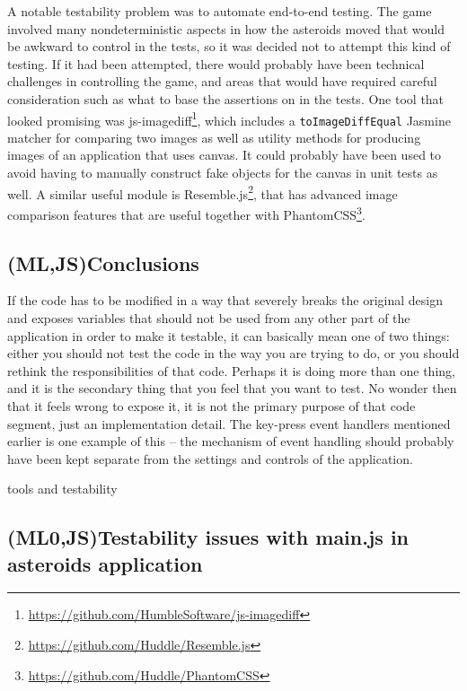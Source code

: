 \documentclass[11pt]{article}
\begin{document}
A notable testability problem was to automate end-to-end testing. The game involved many nondeterministic aspects in how the asteroids moved that would be awkward to control in the tests, so it was decided not to attempt this kind of testing. If it had been attempted, there would probably have been technical challenges in controlling the game, and areas that would have required careful consideration such as what to base the assertions on in the tests. One tool that looked promising was js-imagediff\footnote{\url{https://github.com/HumbleSoftware/js-imagediff}}, which includes a \texttt{toImageDiffEqual} Jasmine matcher for comparing two images as well as utility methods for producing images of an application that uses canvas. It could probably have been used to avoid having to manually construct fake objects for the canvas in unit tests as well. A similar useful module is Resemble.js\footnote{\url{https://github.com/Huddle/Resemble.js}}, that has advanced image comparison features that are useful together with PhantomCSS\footnote{\url{https://github.com/Huddle/PhantomCSS}}.

\subsection{(ML,JS)Conclusions}

If the code has to be modified in a way that severely breaks the original design and exposes variables that should not be used from any other part of the application in order to make it testable, it can basically mean one of two things: either you should not test the code in the way you are trying to do, or you should rethink the responsibilities of that code. Perhaps it is doing more than one thing, and it is the secondary thing that you feel that you want to test. No wonder then that it feels wrong to expose it, it is not the primary purpose of that code segment, just an implementation detail. The key-press event handlers mentioned earlier is one example of this -- the mechanism of event handling should probably have been kept separate from the settings and controls of the application.

tools and testability

\subsection{(ML0,JS)Testability issues with main.js in asteroids application}
\label{subsec:asteroids}
\end{document}
